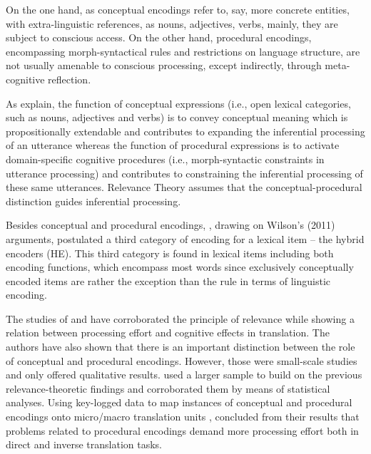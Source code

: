 \documentclass[output=paper]{langsci/langscibook}
\begin{document}
On the one hand, as conceptual encodings refer to, say, more concrete entities, with extra-linguistic references, as nouns, adjectives, verbs, mainly, they are subject to conscious access. On the other hand, procedural encodings, encompassing morph-syntactical rules and restrictions on language structure, are not usually amenable to conscious processing, except indirectly, through meta-cognitive reflection. 



As \citet{Alves2014} explain, the function of conceptual expressions (i.e., open lexical categories, such as nouns, adjectives and verbs) is to convey conceptual meaning which is propositionally extendable and contributes to expanding the inferential processing of an utterance whereas the function of procedural expressions is to activate domain-specific cognitive procedures (i.e., morph-syntactic constraints in utterance processing) and contributes to constraining the inferential processing of these same utterances. Relevance Theory assumes that the conceptual-procedural distinction guides inferential processing. \citep[155]{Alves2014}  



Besides conceptual and procedural encodings, \citet{alves2013}, drawing on Wilson's (2011) arguments, postulated a third category of encoding for a lexical item -- the hybrid encoders (HE). This third category is found in lexical items including both encoding functions, which encompass most words since exclusively conceptually encoded items are rather the exception than the rule in terms of linguistic encoding.



The studies of \citet{alves2007cognitive} and \citet{alves2003} have corroborated the principle of relevance while showing a relation between processing effort and cognitive effects in translation. The authors have also shown that there is an important distinction between the role of conceptual and procedural encodings.  However, those were small-scale studies and only offered qualitative results. \citet{alves2013} used a larger sample to build on the previous relevance-theoretic findings and corroborated them by means of statistical analyses. Using key-logged data to map instances of conceptual and procedural encodings onto micro/macro translation units \citep{alves2009, alves2011}, \citet{alves2013} concluded from their results that problems related to procedural encodings demand more processing effort both in direct and inverse translation tasks.
\end{document}
